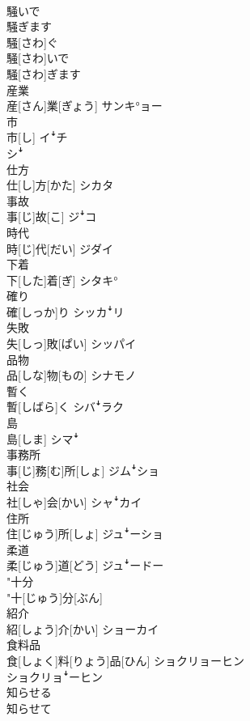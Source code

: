 \documentclass[8pt]{extreport}
\begin{document}
\begin{CJK}{UTF8}{min}
\\	騒いで 
\\	騒ぎます	
\\	騒[さわ]ぐ 
\\	騒[さわ]いで 
\\	騒[さわ]ぎます	
\\	産業	
\\	産[さん]業[ぎょう]	サンキ°ョー
\\	市	
\\	市[し]	イꜜチ 
\\	シꜜ
\\	仕方	
\\	仕[し]方[かた]	シカタ
\\	事故	
\\	事[じ]故[こ]	ジꜜコ
\\	時代	
\\	時[じ]代[だい]	ジダイ
\\	下着	
\\	下[した]着[ぎ]	シタキ°
\\	確り	
\\	確[しっか]り	シッカꜜリ
\\	失敗	
\\	失[しっ]敗[ぱい]	シッパイ
\\	品物	
\\	品[しな]物[もの]	シナモノ
\\	暫く	
\\	暫[しばら]く	シバꜜラク
\\	島	
\\	島[しま]	シマꜜ
\\	事務所	
\\	事[じ]務[む]所[しょ]	ジムꜜショ
\\	社会	
\\	社[しゃ]会[かい]	シャꜜカイ
\\	住所	
\\	住[じゅう]所[しょ]	ジュꜜーショ
\\	柔道	
\\	柔[じゅう]道[どう]	ジュꜜードー
\\	"十分 
\\	"十[じゅう]分[ぶん] 
\\	紹介	
\\	紹[しょう]介[かい]	ショーカイ
\\	食料品	
\\	食[しょく]料[りょう]品[ひん]	ショクリョーヒン 
\\	ショクリョꜜーヒン
\\	知らせる 
\\	知らせて 

\end{CJK}
\end{document}
